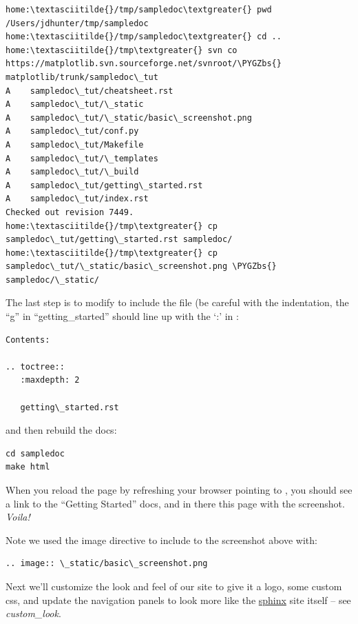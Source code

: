 \documentclass[letterpaper,10pt,english]{sphinxmanual}
\def\PYGZbs{\char`\\}
\begin{document}
\begin{Verbatim}[commandchars=\\\{\}]
home:\textasciitilde{}/tmp/sampledoc\textgreater{} pwd
/Users/jdhunter/tmp/sampledoc
home:\textasciitilde{}/tmp/sampledoc\textgreater{} cd ..
home:\textasciitilde{}/tmp\textgreater{} svn co https://matplotlib.svn.sourceforge.net/svnroot/\PYGZbs{}
matplotlib/trunk/sampledoc\_tut
A    sampledoc\_tut/cheatsheet.rst
A    sampledoc\_tut/\_static
A    sampledoc\_tut/\_static/basic\_screenshot.png
A    sampledoc\_tut/conf.py
A    sampledoc\_tut/Makefile
A    sampledoc\_tut/\_templates
A    sampledoc\_tut/\_build
A    sampledoc\_tut/getting\_started.rst
A    sampledoc\_tut/index.rst
Checked out revision 7449.
home:\textasciitilde{}/tmp\textgreater{} cp sampledoc\_tut/getting\_started.rst sampledoc/
home:\textasciitilde{}/tmp\textgreater{} cp sampledoc\_tut/\_static/basic\_screenshot.png \PYGZbs{}
sampledoc/\_static/
\end{Verbatim}

The last step is to modify  to include the
 file (be careful with the indentation, the
``g'' in ``getting\_started'' should line up with the `:' in :

\begin{Verbatim}[commandchars=\\\{\}]
Contents:

.. toctree::
   :maxdepth: 2

   getting\_started.rst
\end{Verbatim}

and then rebuild the docs:

\begin{Verbatim}[commandchars=\\\{\}]
cd sampledoc
make html
\end{Verbatim}

When you reload the page by refreshing your browser pointing to
, you should see a link to the
``Getting Started'' docs, and in there this page with the screenshot.
\emph{Voila!}

Note we used the image directive to include to the screenshot above
with:

\begin{Verbatim}[commandchars=\\\{\}]
.. image:: \_static/basic\_screenshot.png
\end{Verbatim}

Next we'll customize the look and feel of our site to give it a logo,
some custom css, and update the navigation panels to look more like
the \href{http://sphinx.pocoo.org/}{sphinx} site itself -- see
\emph{custom\_look}.
\end{document}

